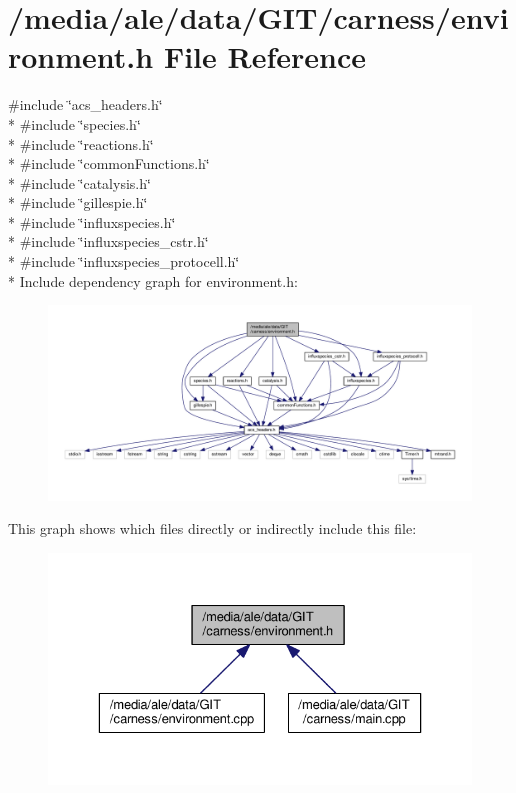 \hypertarget{a00072}{\section{/media/ale/data/\-G\-I\-T/carness/environment.h File Reference}
\label{a00072}
}
{\ttfamily \#include \char`\"{}acs\-\_\-headers.\-h\char`\"{}}\\*
{\ttfamily \#include \char`\"{}species.\-h\char`\"{}}\\*
{\ttfamily \#include \char`\"{}reactions.\-h\char`\"{}}\\*
{\ttfamily \#include \char`\"{}common\-Functions.\-h\char`\"{}}\\*
{\ttfamily \#include \char`\"{}catalysis.\-h\char`\"{}}\\*
{\ttfamily \#include \char`\"{}gillespie.\-h\char`\"{}}\\*
{\ttfamily \#include \char`\"{}influxspecies.\-h\char`\"{}}\\*
{\ttfamily \#include \char`\"{}influxspecies\-\_\-cstr.\-h\char`\"{}}\\*
{\ttfamily \#include \char`\"{}influxspecies\-\_\-protocell.\-h\char`\"{}}\\*
Include dependency graph for environment.\-h\-:\nopagebreak
\begin{figure}[H]
\begin{center}
\leavevmode
\includegraphics[width=350pt]{a00140}
\end{center}
\end{figure}
This graph shows which files directly or indirectly include this file\-:\nopagebreak
\begin{figure}[H]
\begin{center}
\leavevmode
\includegraphics[width=329pt]{a00141}
\end{center}
\end{figure}
